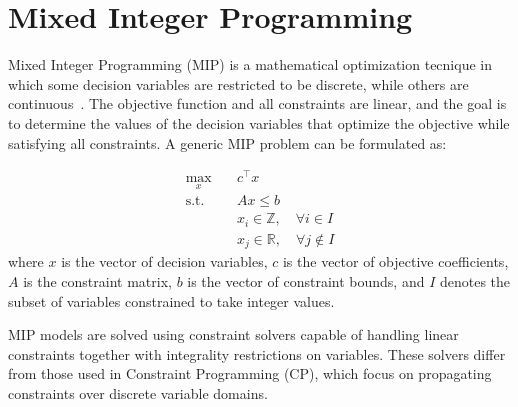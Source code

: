 \section{Mixed Integer Programming}

Mixed Integer Programming (MIP) is a mathematical optimization tecnique in which some decision variables are restricted to be discrete, while others are continuous~\cite{wolsey2007mixed}. The objective function and all constraints are linear, and the goal is to determine the values of the decision variables that optimize the objective while satisfying all constraints. A generic MIP problem can be formulated as:

\begin{equation*}
\begin{aligned}
\max_{x} \quad & c^\top x \\
\text{s.t.} \quad & Ax \leq b \\
& x_i \in \mathbb{Z}, \quad \forall i \in I \\
& x_j \in \mathbb{R}, \quad \forall j \notin I
\end{aligned}
\end{equation*}
where $x$ is the vector of decision variables, $c$ is the vector of objective coefficients, $A$ is the constraint matrix, $b$ is the vector of constraint bounds, and $I$ denotes the subset of variables constrained to take integer values.

MIP models are solved using constraint solvers capable of handling linear constraints together with integrality restrictions on variables. These solvers differ from those used in Constraint Programming (CP), which focus on propagating constraints over discrete variable domains.

